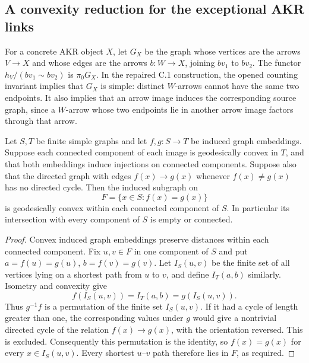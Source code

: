\subsection{A convexity reduction for the exceptional AKR links}

For a concrete AKR object $X$, let $G_X$ be the graph whose vertices
are the arrows $V\to X$ and whose edges are the arrows $b:W\to X$,
joining $bv_1$ to $bv_2$. The functor
$h_V/(bv_1\sim bv_2)$ is $\pi_0G_X$. In the repaired C.1
construction, the opened counting invariant implies that $G_X$ is
simple: distinct $W$-arrows cannot have the same two endpoints.
It also implies that an arrow image induces the corresponding
source graph, since a $W$-arrow whose two endpoints lie in another
arrow image factors through that arrow.

\begin{lemma}
\label{C:convex-fixed}
Let $S,T$ be finite simple graphs and let $f,g:S\to T$ be induced
graph embeddings. Suppose each connected component of each image
is geodesically convex in $T$, and that both embeddings induce
injections on connected components. Suppose also that the directed
graph with edges $f(x)\to g(x)$ whenever $f(x)\ne g(x)$ has no
directed cycle. Then the induced subgraph on
\[
 F=\{x\in S:f(x)=g(x)\}
\]
is geodesically convex within each connected component of $S$.
In particular its intersection with every component of $S$ is
empty or connected.
\end{lemma}
\begin{proof}
Convex induced graph embeddings preserve distances within each
connected component. Fix $u,v\in F$ in one component of $S$ and
put $a=f(u)=g(u)$, $b=f(v)=g(v)$. Let $I_S(u,v)$ be the finite
set of all vertices lying on a shortest path from $u$ to $v$,
and define $I_T(a,b)$ similarly. Isometry and convexity give
\[
 f(I_S(u,v))=I_T(a,b)=g(I_S(u,v)).
\]
Thus $g^{-1}f$ is a permutation of the finite set $I_S(u,v)$.
If it had a cycle of length greater than one, the corresponding
values under $g$ would give a nontrivial directed cycle of the
relation $f(x)\to g(x)$, with the orientation reversed. This is
excluded. Consequently this permutation is the identity, so
$f(x)=g(x)$ for every $x\in I_S(u,v)$. Every shortest $u$--$v$
path therefore lies in $F$, as required.
\end{proof}

